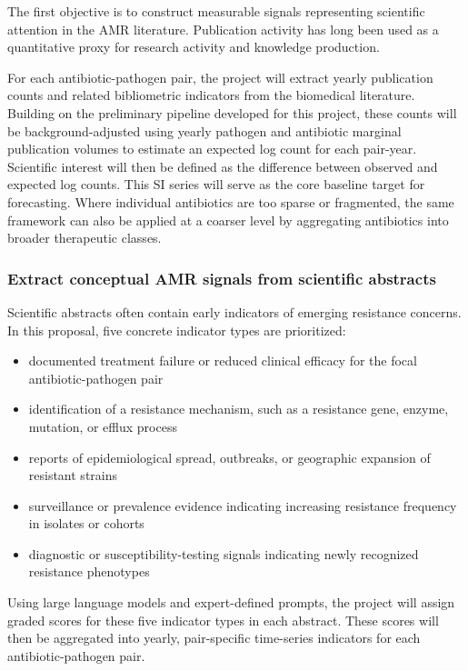 \documentclass[
]{article}
\providecommand{\tightlist}{%
  \setlength{\itemsep}{0pt}\setlength{\parskip}{0pt}}
\begin{document}
The first objective is to construct measurable signals representing
scientific attention in the AMR literature. Publication activity has
long been used as a quantitative proxy for research activity and
knowledge production.

For each antibiotic-pathogen pair, the project will extract yearly
publication counts and related bibliometric indicators from the
biomedical literature. Building on the preliminary pipeline developed
for this project, these counts will be background-adjusted using yearly
pathogen and antibiotic
marginal publication volumes to estimate an expected log count for each
pair-year. Scientific interest will then be defined as the difference
between observed and expected log counts. This SI series will serve as
the core baseline target for forecasting. Where individual antibiotics
are too sparse or fragmented, the same framework can also be applied at
a coarser level by aggregating antibiotics into broader therapeutic
classes.

\subsubsection{Extract conceptual AMR signals from
scientific
abstracts}\label{objective-2-extract-conceptual-amr-signals-from-scientific-abstracts}

Scientific abstracts often contain early indicators of emerging
resistance concerns. In this proposal, five concrete indicator types are
prioritized:

\begin{itemize}
\tightlist
\item
  documented treatment failure or reduced clinical efficacy for the
  focal antibiotic-pathogen pair
\item
  identification of a resistance mechanism, such as a resistance gene,
  enzyme, mutation, or efflux process
\item
  reports of epidemiological spread, outbreaks, or geographic expansion
  of resistant strains
\item
  surveillance or prevalence evidence indicating increasing resistance
  frequency in isolates or cohorts
\item
  diagnostic or susceptibility-testing signals indicating newly
  recognized resistance phenotypes
\end{itemize}

Using large language models and expert-defined prompts, the project
will assign graded scores for these five indicator types in each
abstract. These scores will then be aggregated into yearly,
pair-specific time-series indicators for each antibiotic-pathogen pair.
\end{document}
